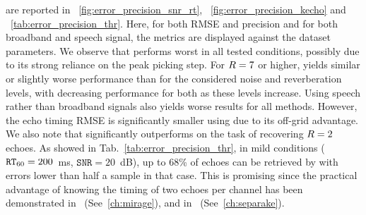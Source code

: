  are reported in ~\cref{fig:error_precision_snr_rt}, ~\cref{fig:error_precision_kecho} and ~\cref{tab:error_precision_thr}.
Here, for both RMSE and precision and for both broadband and speech signal, the metrics are displayed against the dataset parameters.
We observe that \algoBsn{} performs worst in all tested conditions, possibly due to its strong reliance on the peak picking step.
For $R=7$ or higher, \algoBraire{} yields similar or slightly worse performance than \algoCrocco{} for the considered noise and reverberation levels, with decreasing performance for both as these levels increase.
Using speech rather than broadband signals also yields worse results for all methods.
However, the echo timing RMSE is significantly smaller using \algoBraire{} due to its off-grid advantage.
We also note that \algoBraire{} significantly outperforms \algoCrocco{} on the task of recovering $R=2$ echoes.
As showed in Tab.~\ref{tab:error_precision_thr}, in mild conditions ($\mathtt{RT}_{60} = 200$~ms, $\mathtt{SNR} = 20$~dB), up to 68\% of echoes can be retrieved by \algoBraire{} with errors lower than half a sample in that case.
This is promising since the practical advantage of knowing the timing of two echoes per channel has been demonstrated in~ (See~\cref{ch:mirage}), and in~ (See~\cref{ch:separake}).


